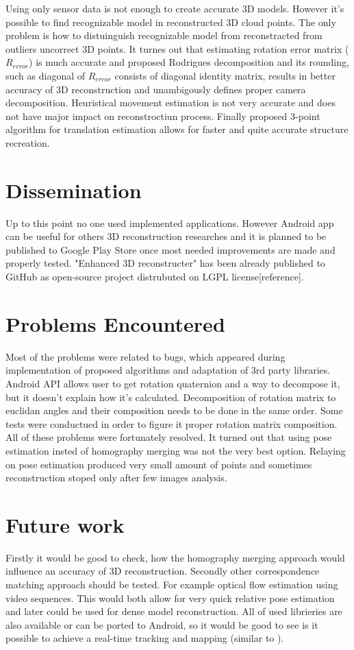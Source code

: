 Using only sensor data is not enough to create accurate 3D models. However it's possible to find recognizable model in reconstructed 3D cloud points. The only problem is how to distuinguish recognizable model from reconstracted from outliers uncorrect 3D points. It turnes out that estimating rotation error matrix ($R_{error}$) is much accurate and proposed Rodrigues decomposition and its rounding, such as diagonal of $R_{error}$ consists of diagonal identity matrix, results in better accuracy of 3D reconstruction and unambigously defines proper camera decomposition. Heuristical movement estimation is not very accurate and does not have major impact on reconstroctiun process. Finally proposed 3-point algorithm for translation estimation allows for faster and quite accurate structure recreation.
\section{Dissemination}
Up to this point no one used implemented applications. However Android app can be useful for others 3D reconstruction researches and it is planned to be published to Google Play Store once most needed improvements are made and properly tested. "Enhanced 3D reconstructer" has been already published to GitHub as open-source project distrubuted on LGPL license[reference].
\section{Problems Encountered}
Most of the problems were related to bugs, which appeared during implementation of proposed algorithms and adaptation of 3rd party libraries. Android API allows user to get rotation quaternion and a way to decompose it, but it doesn't explain how it's calculated. Decomposition of rotation matrix to euclidan angles and their composition needs to be done in the same order. Some tests were conductued in order to figure it proper rotation matrix composition. All of these problems were fortunately resolved. It turned out that using pose estimation insted of homography merging was not the very best option. Relaying on pose estimation produced very small amount of points and sometimes reconstruction stoped only after few images analysis.
\section{Future work}
Firstly it would be good to check, how the homography merging approach would influence an accuracy of 3D reconstruction. Secondly 
 other correspondence matching approach should be tested. For example optical flow estimation using video sequences. This would both allow for very quick relative pose estimation and later could be used for dense model reconstruction. All of used librieries are also available or can be ported to Android, so it would be good to see is it possible to achieve a real-time tracking and mapping (similar to \cite{ptam}).



